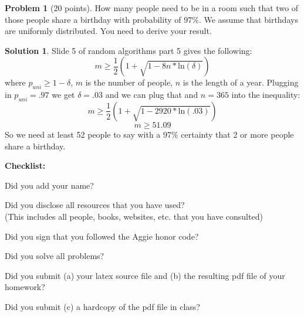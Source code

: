 \documentclass{article}
\theoremstyle{definition}
\newtheorem{problem}{Problem}
\newtheorem*{solution}{Solution}
\newcommand{\checklist}{\noindent\textbf{Checklist:}
\begin{compactitem}[$\Box$] 
\item Did you add your name? 
\item Did you disclose all resources that you have used? \\
(This includes all people, books, websites, etc. that you have consulted)
\item Did you sign that you followed the Aggie honor code? 
\item Did you solve all problems? 
\item Did you submit (a) your latex source file and (b) the resulting pdf file
  of your homework?
\item Did you submit (c) a hardcopy of the pdf file in class? 
\end{compactitem}
}
\begin{document}
\begin{problem}[20 points] How many people need to be in a room such that two of
  those   people share a birthday with
  probability of $97\%$.  We assume that birthdays are uniformly
  distributed. You need to derive your result. 
\end{problem}
\begin{solution}
Slide 5 of random algorithms part 5 gives the following:
$$m \geq \frac{1}{2}(1 + \sqrt{1-8n*\text{ln}(\delta)})$$
where $p_{uni} \geq 1 - \delta$, $m$ is the number of people, $n$ is the length of a year. Plugging in $p_{uni}=.97$ we get $\delta = .03$ and we can plug that and $n=365$ into the inequality:
$$ m \geq \frac{1}{2}(1 + \sqrt{1-2920*\text{ln}(.03)}) $$
$$ m \geq 51.09$$
So we need at least 52 people to say with a 97\% certainty that 2 or more people share a birthday.
\end{solution}



\goodbreak
\checklist
\end{document}

